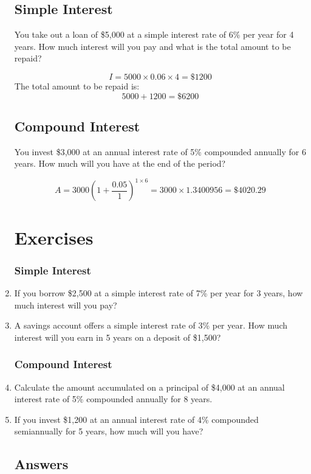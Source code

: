 \documentclass[12pt]{article}
\begin{document}
\begin{enumerate}
\subsection*{Simple Interest}
You take out a loan of \$5,000 at a simple interest rate of 6\% per year for 4 years. How much interest will you pay and what is the total amount to be repaid?

\[
I = 5000 \times 0.06 \times 4 = \$1200
\]
The total amount to be repaid is:
\[
5000 + 1200 = \$6200
\]

\subsection*{Compound Interest}
You invest \$3,000 at an annual interest rate of 5\% compounded annually for 6 years. How much will you have at the end of the period?

\[
A = 3000 \left(1 + \frac{0.05}{1}\right)^{1 \times 6} = 3000 \times 1.3400956 = \$4020.29
\]

\newpage

\section*{Exercises}

\subsubsection*{Simple Interest}

\setcounter{enumi}{0}
\item If you borrow \$2,500 at a simple interest rate of 7\% per year for 3 years, how much interest will you pay?
\item A savings account offers a simple interest rate of 3\% per year. How much interest will you earn in 5 years on a deposit of \$1,500?

\subsubsection*{Compound Interest}

\setcounter{enumi}{0}
\item Calculate the amount accumulated on a principal of \$4,000 at an annual interest rate of 5\% compounded annually for 8 years.
\item If you invest \$1,200 at an annual interest rate of 4\% compounded semiannually for 5 years, how much will you have?

\subsection*{Answers}


\end{enumerate}
\end{document}
